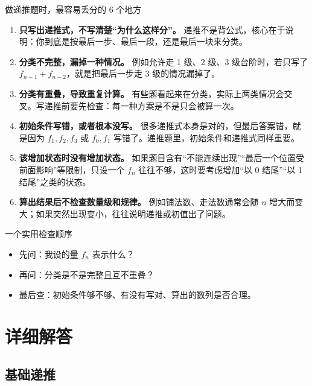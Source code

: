 \documentclass[11pt,a4paper,fontset=fandol]{ctexart}
\theoremstyle{formalexample}
\begin{document}
\begin{goalbox}{做递推题时，最容易丢分的 6 个地方}
\begin{enumerate}
  \item \textbf{只写出递推式，不写清楚“为什么这样分”。}  
  递推不是背公式，核心在于说明：你到底是按最后一步、最后一段，还是最后一块来分类。

  \item \textbf{分类不完整，漏掉一种情况。}  
  例如允许走 1 级、2 级、3 级台阶时，若只写了 $f_{n-1}+f_{n-2}$，就是把最后一步走 3 级的情况漏掉了。

  \item \textbf{分类有重叠，导致重复计算。}  
  有些题看起来在分类，实际上两类情况会交叉。写递推前要先检查：每一种方案是不是只会被算一次。

  \item \textbf{初始条件写错，或者根本没写。}  
  很多递推式本身是对的，但最后答案错，就是因为 $f_1,f_2,f_3$ 或 $f_0,f_1$ 写错了。递推题里，初始条件和递推式同样重要。

  \item \textbf{该增加状态时没有增加状态。}  
  如果题目含有“不能连续出现”“最后一个位置受前面影响”等限制，只设一个 $f_n$ 往往不够，这时要考虑增加“以 0 结尾”“以 1 结尾”之类的状态。

  \item \textbf{算出结果后不检查数量级和规律。}  
  例如铺法数、走法数通常会随 $n$ 增大而变大；如果突然出现变小，往往说明递推或初值出了问题。
\end{enumerate}
\end{goalbox}

\begin{notebox}{一个实用检查顺序}
\begin{itemize}
  \item 先问：我设的量 $f_n$ 表示什么？
  \item 再问：分类是不是完整且互不重叠？
  \item 最后查：初始条件够不够、有没有写对、算出的数列是否合理。
\end{itemize}
\end{notebox}

\newpage
\appendix
\section{详细解答}

\subsection*{基础递推}
\end{document}
